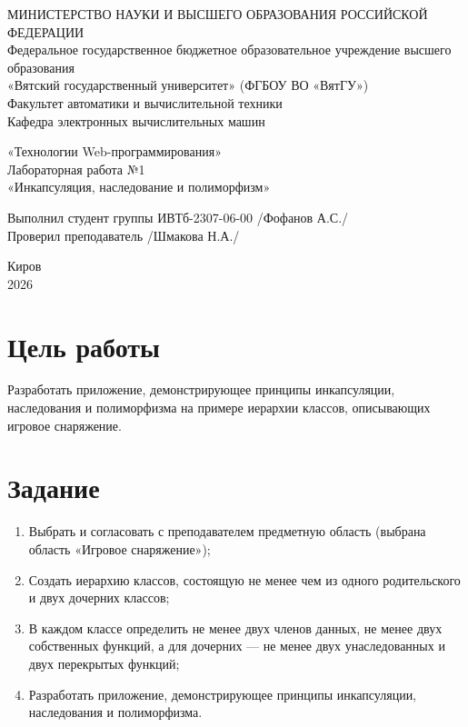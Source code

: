 \documentclass[oneside,a4paper,14pt]{extarticle}
\begin{document}
\pagestyle{empty}
\begin{center}
    {МИНИСТЕРСТВО НАУКИ И ВЫСШЕГО ОБРАЗОВАНИЯ РОССИЙСКОЙ ФЕДЕРАЦИИ \\
    Федеральное государственное бюджетное образовательное учреждение высшего образования \\
    «Вятский государственный университет» (ФГБОУ ВО «ВятГУ») \\
    Факультет автоматики и вычислительной техники \\
    Кафедра электронных вычислительных машин \\ }

    \vspace*{35mm}

    {«Технологии Web-программирования» \\
    Лабораторная работа №1 \\
    «Инкапсуляция, наследование и полиморфизм» }
\end{center}

\vspace*{35mm}
       Выполнил студент группы ИВТб-2307-06-00 \hspace*{1mm} \underline{\hspace{10mm}} /Фофанов А.С./  \\
       \hspace*{12mm}Проверил преподаватель \hspace*{44mm} \underline{\hspace{10mm}} /Шмакова Н.А./ \\

\begin{center}
    \vspace*{35mm}
    \large{Киров \\
    2026}
\end{center}

\newpage
\pagestyle{plain}
\setcounter{page}{2}

\section*{\normalsize Цель работы}
Разработать приложение, демонстрирующее принципы инкапсуляции, наследования и полиморфизма на примере иерархии классов, описывающих игровое снаряжение.

\section*{\normalsize Задание}
\begin{enumerate}
    \item Выбрать и согласовать с преподавателем предметную область (выбрана область «Игровое снаряжение»);
    \item Создать иерархию классов, состоящую не менее чем из одного родительского и двух дочерних классов;
    \item В каждом классе определить не менее двух членов данных, не менее двух собственных функций, а для дочерних — не менее двух унаследованных и двух перекрытых функций;
    \item Разработать приложение, демонстрирующее принципы инкапсуляции, наследования и полиморфизма.
\end{enumerate}
\end{document}
